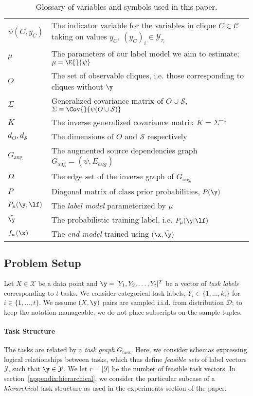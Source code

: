 \documentclass[letterpaper]{article}
\begin{document}
\begin{appendix}
\begin{table*}[h]
\begin{tabular}{l l}
$\psi(C, y_C)$ & The indicator variable for the variables in clique $C \in \mathcal{C}$ taking on values $y_C$, $(y_C)_i \in \mathcal{Y}_{\tau_i}$ \\
$\mu$ & The parameters of our label model we aim to estimate; $\mu = \E{}{ \psi }$ \\
$O$ & The set of observable cliques, i.e. those corresponding to cliques without $\y$ \\
$\Sigma$ & Generalized covariance matrix of $O \cup \mathcal{S}$, $\Sigma \equiv \Cov{}{ \psi(O \cup \mathcal{S}) }$ \\
$K$ & The inverse generalized covariance matrix $K = \Sigma^{-1}$ \\
$d_O, d_\mathcal{S}$ & The dimensions of $O$ and $\mathcal{S}$ respectively \\
$G_{\text{aug}}$ & The augmented source dependencies graph $G_{\text{aug}} = (\psi, E_{aug})$ \\
$\Omega$ & The edge set of the inverse graph of $G_{\text{aug}}$ \\
$P$ & Diagonal matrix of class prior probabilities, $P(\y)$ \\
$P_\mu(\y, \lf)$ & The \textit{label model} parameterized by $\mu$ \\
$\tilde{\y}$ & The probabilistic training label, i.e. $P_\mu(\y|\lf)$ \\
$f_w(\x)$ & The \textit{end model} trained using $(\x, \tilde{\y})$ \\
\end{tabular}
\caption{
	Glossary of variables and symbols used in this paper.
}
\label{table:glossary}
\end{table*}

\subsection{Problem Setup}
\label{appendix:problem-setup}
Let $X \in \mathcal{X}$ be a data point and $\y = [Y_1, Y_2, \ldots, Y_t]^T$ be a vector of \textit{task labels} corresponding to $t$ tasks.
We consider categorical task labels, $Y_i \in \{1, \ldots, k_i\}$ for $i \in \{1, \ldots ,t\}$.
We assume $(X, \y)$ pairs are sampled i.i.d. from distribution $\mathcal{D}$; to keep the notation manageable, we do not place subscripts on the sample tuples.

\paragraph*{Task Structure}
The tasks are related by a \emph{task graph} $G_{\text{task}}$.
Here, we consider schemas expressing logical relationships between tasks, which thus define \textit{feasible sets} of label vectors $\mathcal{Y}$, such that $\y \in \mathcal{Y}$.
We let $r = |\mathcal{Y}|$ be the number of feasible task vectors.
In section~\ref{appendix:hierarchical}, we consider the particular subcase of a \textit{hierarchical} task structure as used in the experiments section of the paper.

\end{appendix}
\end{document}
